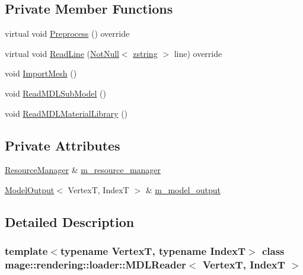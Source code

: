 \subsection*{Private Member Functions}
\begin{DoxyCompactItemize}
\item 
virtual void \hyperlink{classmage_1_1rendering_1_1loader_1_1_m_d_l_reader_a397f0c0eedc56c983fc3a7074aa4e577}{Preprocess} () override
\item 
virtual void \hyperlink{classmage_1_1rendering_1_1loader_1_1_m_d_l_reader_a121bfa0a48d01bdc37cf09b7f3a25a27}{Read\+Line} (\hyperlink{namespacemage_a8769f9d670d6b585ea306cb1062af94b}{Not\+Null}$<$ \hyperlink{namespacemage_a4163ec9a9a27d5e7f4b452dcb99cb2b9}{zstring} $>$ line) override
\item 
void \hyperlink{classmage_1_1rendering_1_1loader_1_1_m_d_l_reader_a512618ed9e79671dbcb468d155272b7e}{Import\+Mesh} ()
\item 
void \hyperlink{classmage_1_1rendering_1_1loader_1_1_m_d_l_reader_afe15d41185ac5f4de6607561d7068d8c}{Read\+M\+D\+L\+Sub\+Model} ()
\item 
void \hyperlink{classmage_1_1rendering_1_1loader_1_1_m_d_l_reader_a40697c5c645e00ba6f4cc5cd28872b8f}{Read\+M\+D\+L\+Material\+Library} ()
\end{DoxyCompactItemize}
\subsection*{Private Attributes}
\begin{DoxyCompactItemize}
\item 
\hyperlink{classmage_1_1rendering_1_1_resource_manager}{Resource\+Manager} \& \hyperlink{classmage_1_1rendering_1_1loader_1_1_m_d_l_reader_ae1a276e89104344daa25666e4b074643}{m\+\_\+resource\+\_\+manager}
\item 
\hyperlink{structmage_1_1rendering_1_1_model_output}{Model\+Output}$<$ VertexT, IndexT $>$ \& \hyperlink{classmage_1_1rendering_1_1loader_1_1_m_d_l_reader_aab6301fae258aaea1619856000a29e53}{m\+\_\+model\+\_\+output}
\end{DoxyCompactItemize}


\subsection{Detailed Description}
\subsubsection*{template$<$typename VertexT, typename IndexT$>$\newline
class mage\+::rendering\+::loader\+::\+M\+D\+L\+Reader$<$ Vertex\+T, Index\+T $>$}

